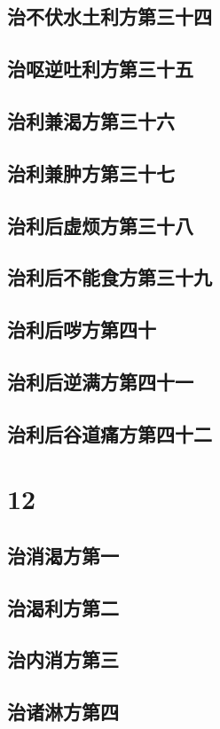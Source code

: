 \documentclass[a4paper,12pt,UTF8,twoside]{ctexbook}
\begin{document}
\chapter{治不伏水土利方第三十四}
\chapter{治呕逆吐利方第三十五}
\chapter{治利兼渴方第三十六}
\chapter{治利兼肿方第三十七}
\chapter{治利后虚烦方第三十八}
\chapter{治利后不能食方第三十九}
\chapter{治利后哕方第四十}
\chapter{治利后逆满方第四十一}
\chapter{治利后谷道痛方第四十二}

\part{12}
\chapter{治消渴方第一}
\chapter{治渴利方第二}
\chapter{治内消方第三}
\chapter{治诸淋方第四}
\end{document}
